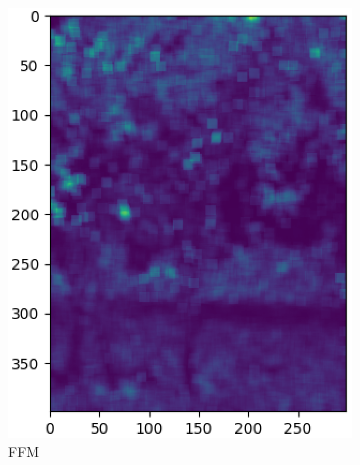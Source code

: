 \documentclass{article}
\begin{document}
\begin{figure}[!h]
\begin{subfigure}{.2\textwidth}
    \includegraphics[width=\textwidth]{Bilder/MSE_Bilder/cropped/kernel10_fourier_256_0.01_G.eps}
    \caption{FFM}
    \label{MSE256FFM}
  \end{subfigure}\hfil
  \begin{subfigure}{.2\textwidth}

\end{subfigure}
\end{figure}
\end{document}
